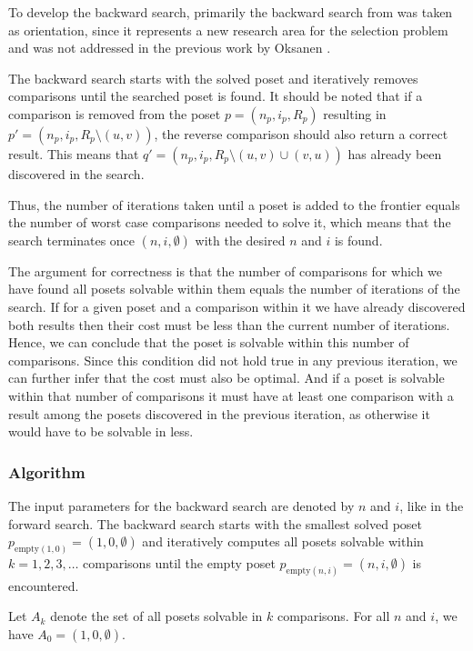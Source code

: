 \documentclass[10pt,journal,compsoc]{IEEEtran}
\begin{document}
To develop the backward search, primarily the backward search from \cite{stober2022lower} was taken as orientation, since it represents a new research area for the selection problem and was not addressed in the previous work by Oksanen \cite{Oksanen}.

The backward search starts with the solved poset and iteratively removes comparisons until the searched poset is found.
It should be noted that if a comparison is removed from the poset $p = (n_p, i_p, R_p)$ resulting in $p' = (n_p, i_p, R_p \setminus (u, v))$, the reverse comparison should also return a correct result.
This means that $q' = (n_p, i_p, R_p \setminus (u, v) \cup (v, u))$ has already been discovered in the search.

Thus, the number of iterations taken until a poset is added to the frontier equals the number of worst case comparisons needed to solve it, which means that the search terminates once $(n, i, \emptyset)$ with the desired $n$ and $i$ is found.

The argument for correctness is that the number of comparisons for which we have found all posets solvable within them equals the number of iterations of the search.
If for a given poset and a comparison within it we have already discovered both results then their cost must be less than the current number of iterations.
Hence, we can conclude that the poset is solvable within this number of comparisons.
Since this condition did not hold true in any previous iteration, we can further infer that the cost must also be optimal.
And if a poset is solvable within that number of comparisons it must have at least one comparison with a result among the posets discovered in the previous iteration, as otherwise it would have to be solvable in less.


\subsubsection{Algorithm} \label{sec:backward:algorithm}
The input parameters for the backward search are denoted by $n$ and $i$, like in the forward search.
The backward search starts with the smallest solved poset $p_{\text{empty} (1, 0)} = (1, 0, \emptyset)$ and iteratively computes all posets solvable within $k = 1, 2, 3, \dots$ comparisons until the empty poset $p_{\text{empty} (n, i)} = (n, i, \emptyset)$ is encountered.

Let $A_k$ denote the set of all posets solvable in $k$ comparisons.
For all $n$ and $i$, we have $A_0 = { (1, 0, \emptyset) }$.
\end{document}
